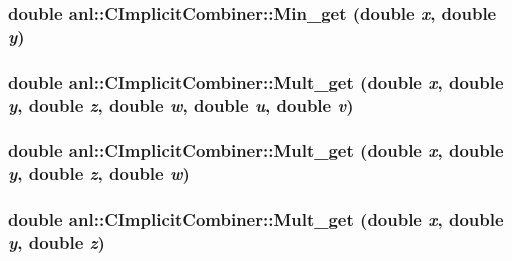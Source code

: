 \label{classanl_1_1CImplicitCombiner_a59600499e680365658c78057ddc9be8a}
\hypertarget{classanl_1_1CImplicitCombiner_a3a3a88babf1d5ba01971a2314b31ec2e}{
\subsubsection[{Min\_\-get}]{\setlength{\rightskip}{0pt plus 5cm}double anl::CImplicitCombiner::Min\_\-get (double {\em x}, \/  double {\em y})}}
\label{classanl_1_1CImplicitCombiner_a3a3a88babf1d5ba01971a2314b31ec2e}
\hypertarget{classanl_1_1CImplicitCombiner_ac3b7afae5a29d790331deae8930fcf85}{
\subsubsection[{Mult\_\-get}]{\setlength{\rightskip}{0pt plus 5cm}double anl::CImplicitCombiner::Mult\_\-get (double {\em x}, \/  double {\em y}, \/  double {\em z}, \/  double {\em w}, \/  double {\em u}, \/  double {\em v})}}
\label{classanl_1_1CImplicitCombiner_ac3b7afae5a29d790331deae8930fcf85}
\hypertarget{classanl_1_1CImplicitCombiner_aa0b40bbb660865e5f18aa82736c7d2d1}{
\subsubsection[{Mult\_\-get}]{\setlength{\rightskip}{0pt plus 5cm}double anl::CImplicitCombiner::Mult\_\-get (double {\em x}, \/  double {\em y}, \/  double {\em z}, \/  double {\em w})}}
\label{classanl_1_1CImplicitCombiner_aa0b40bbb660865e5f18aa82736c7d2d1}
\hypertarget{classanl_1_1CImplicitCombiner_ae2e84d5ea862a45c0512ee86f51e9ead}{
\subsubsection[{Mult\_\-get}]{\setlength{\rightskip}{0pt plus 5cm}double anl::CImplicitCombiner::Mult\_\-get (double {\em x}, \/  double {\em y}, \/  double {\em z})}}
